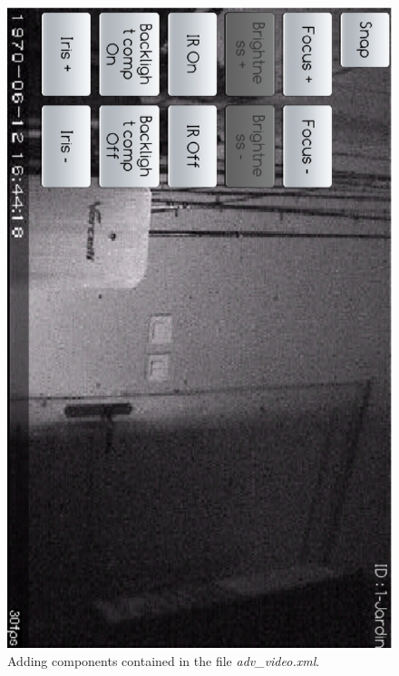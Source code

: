 \begin{center}
\begin{figure}[H] 
  \label{videoViewAdvC}
    \centering
   \includegraphics[angle=90,scale=0.3]{Images/videoViewAdvC.eps}
  \caption{Adding components contained in the file \textit{adv\_video.xml}.}
\end{figure}


\end{center}

